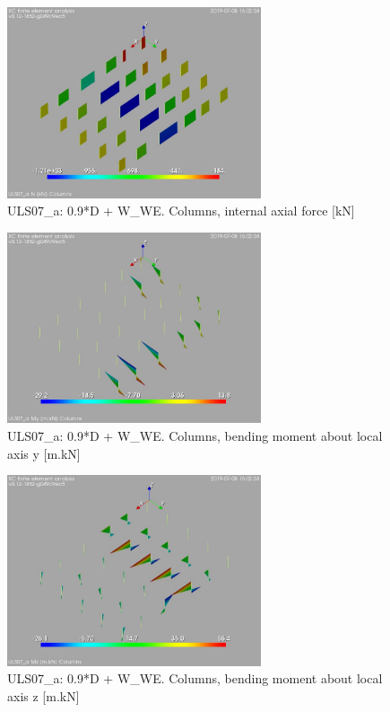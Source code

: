 \begin{figure}
\begin{center}
\includegraphics[width=75mm]{annex_res_columns/graphics/resSimplLC/ULS07_acolumnsN}
\caption{ULS07\_a: 0.9*D + W\_WE. Columns, internal axial force [kN]}
\end{center}
\end{figure}
\begin{figure}
\begin{center}
\includegraphics[width=75mm]{annex_res_columns/graphics/resSimplLC/ULS07_acolumnsMy}
\caption{ULS07\_a: 0.9*D + W\_WE. Columns, bending moment about local axis y [m.kN]}
\end{center}
\end{figure}
\begin{figure}
\begin{center}
\includegraphics[width=75mm]{annex_res_columns/graphics/resSimplLC/ULS07_acolumnsMz}
\caption{ULS07\_a: 0.9*D + W\_WE. Columns, bending moment about local axis z [m.kN]}
\end{center}
\end{figure}

